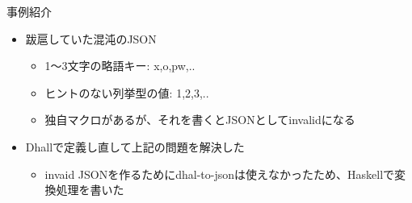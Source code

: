 \documentclass[unicode,12pt]{beamer}
\begin{document}
\begin{frame}[plain]{事例紹介}
  \begin{itemize}
  \item 跋扈していた混沌のJSON
    \begin{itemize}
    \item 1〜3文字の略語キー: x,o,pw,..
    \item ヒントのない列挙型の値: 1,2,3,..
    \item 独自マクロがあるが、それを書くとJSONとしてinvalidになる
    \end{itemize}
  \item Dhallで定義し直して上記の問題を解決した
    \begin{itemize}
    \item invaid JSONを作るためにdhal-to-jsonは使えなかったため、Haskellで変換処理を書いた
    \end{itemize}
  \end{itemize}
\end{frame}
\end{document}
